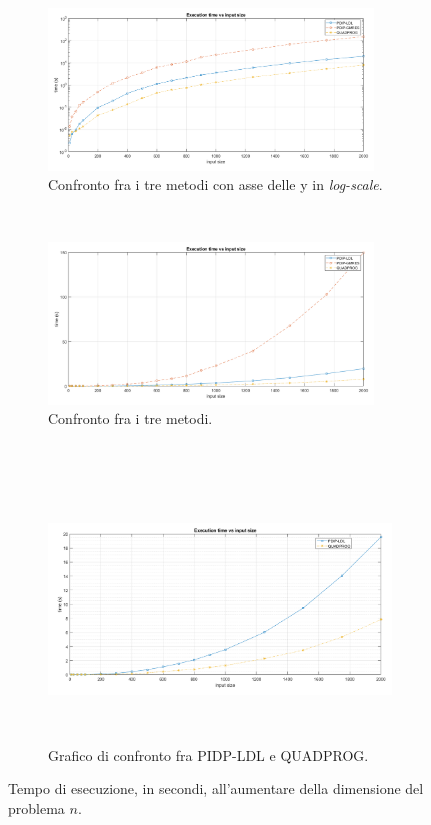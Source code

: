 \begin{figure}[h!]
    \centering
    \begin{subfigure}[h]{0.5\textwidth}
        \centering
        \includegraphics[height=4.3cm]{img/MU1.png}
    \caption{Confronto fra i tre metodi con asse delle y in \textit{log-scale}.\label{fig:exp111}}
    \end{subfigure}%
    ~ 
    \begin{subfigure}[h]{0.5\textwidth}
        \centering
               \includegraphics[height=4.3cm]{img/MU10.png}
    \caption{Confronto fra i tre metodi. \label{fig:exp112}}
    \end{subfigure}
    ~\newline
     \begin{subfigure}[h]{0.8\textwidth}
        \centering
                \includegraphics[height=7cm]{img/MU11.png}
    \caption{Grafico di confronto fra PIDP-LDL e QUADPROG. \label{fig:exp113}}
    \end{subfigure}
    \caption{Tempo di esecuzione, in secondi, all'aumentare della dimensione del problema $n$. \label{fig:exp1}}
\end{figure}



